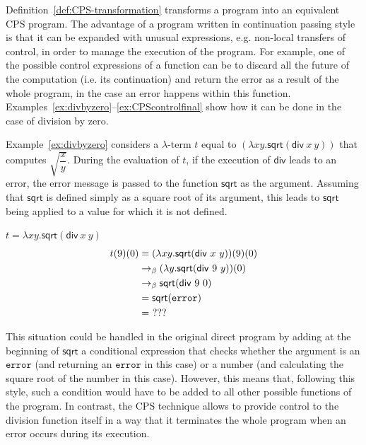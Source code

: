 Definition~\ref{def:CPS-transformation} transforms a program into an equivalent CPS program. The advantage of a program written in continuation passing style is that it can be expanded with unusual expressions, e.g. non-local transfers of control, in order to manage the execution of the program. For example, one of the possible control expressions of a function can be to  discard all the future of the computation (i.e. its continuation) and return the error as a result of the whole program, in the case an error happens within this function. Examples~\ref{ex:divbyzero}--\ref{ex:CPScontrolfinal} show how it can be done in the case of division by zero.
%

Example~\ref{ex:divbyzero} considers a $\lambda$-term $t$ equal to $(\lambda xy. \mathsf{sqrt} (\mathsf{div} \ x \ y)) $ that computes $\sqrt{ \dfrac{x}{y}}$. During the evaluation of $t$, if the execution of $\mathsf{div}$ leads to an error, the error message is passed to the function $\mathsf{sqrt}$ as the argument. Assuming that $\mathsf{sqrt}$ is defined simply as a square root of its argument, this leads to $\mathsf{sqrt}$ being applied to a value for which it is not defined. 
\begin{example} \label{ex:divbyzero} $t  = \lambda xy. \mathsf{sqrt} (\mathsf{div} \ x \ y) $
\begin{align}
%
%
t(9)(0) & =  (\lambda xy. \mathsf{sqrt} (\mathsf{div} \ x \ y))(9)(0)  \notag \\
& \bconv   (\lambda y. \mathsf{sqrt} (\mathsf{div} \ 9 \ y) ) (0)  \notag \\
& \bconv \mathsf{sqrt} (\mathsf{div} \ 9 \ 0)  \notag \\
& = \mathsf{sqrt} (\mathtt{error} ) \label{sqrterrow}\\
& =  \ ??? \notag
\end{align} \qex
\end{example}

This situation could be handled in the original direct program by adding at the beginning of $\mathsf{sqrt}$ a conditional expression that checks whether the argument is an $\mathtt{error}$ (and returning an  $\mathtt{error}$ in this case) or a number (and calculating the square root of the number in this case). However, this means that, following this style, such a condition would have to be added to all other possible functions of the program. In contrast, the CPS technique allows to provide control to the division function itself in a way that it terminates the whole program when an error occurs during its execution.

